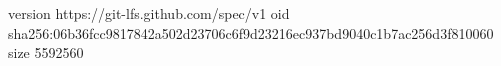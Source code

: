 version https://git-lfs.github.com/spec/v1
oid sha256:06b36fcc9817842a502d23706c6f9d23216ec937bd9040c1b7ac256d3f810060
size 5592560
